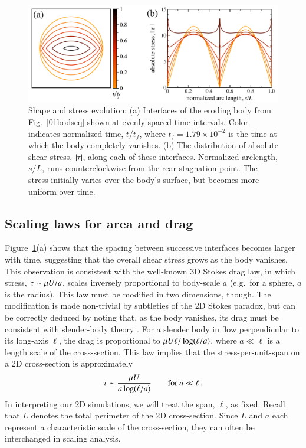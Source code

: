\documentclass[preprint, 10pt]{elsarticle}
\begin{document}
\begin{figure}%
\begin{center}
\includegraphics[width = 0.8 \textwidth]{./figs/shrink_intface.pdf}
\caption{
Shape and stress evolution: (a) Interfaces of the eroding body from Fig.~\ref{01bodseq} shown at evenly-spaced time intervals. Color indicates normalized time, $t/t_f$, where $t_f = 1.79 \times 10^{-2}$ is the time at which the body completely vanishes. (b) The distribution of absolute shear stress, $\lvert \tau \rvert$, along each of these interfaces. Normalized arclength, $s/L$, runs counterclockwise from the rear stagnation point. The stress initially varies over the body's surface, but becomes more uniform over time.}
\label{shrink_intface}
\end{center}
\end{figure}

\subsection{Scaling laws for area and drag}
\label{sec:scaling}

Figure~\ref{shrink_intface}(a) shows that the spacing between successive interfaces becomes larger with time, suggesting that the overall shear stress grows as the body vanishes. This observation is consistent with the well-known 3D Stokes drag law, in which stress, $\tau \sim \mu U / a$, scales inversely proportional to body-scale $a$ (e.g.~for a sphere, $a$ is the radius). This law must be modified in two dimensions, though. The modification is made non-trivial by subtleties of the 2D Stokes paradox, but can be correctly deduced by noting that, as the body vanishes, its drag must be consistent with slender-body theory \cite{poz1997, bouzarth2007epicyclic, camassa2008trajectory, MooreJFM2012, zhao2015transportation}. 
For a slender body in flow perpendicular to its long-axis $\ell$, the drag is proportional to
$\mu U \ell/ \log(\ell/a)$, where $a \ll \ell $ is a length scale of the cross-section. This law implies that the stress-per-unit-span on a 2D cross-section is approximately
\begin{align}
  \label{eqn:stresslaw}
  \tau \sim \frac{\mu U}{a \log(\ell/a)} \qquad \text{for } a \ll \ell \, .
\end{align}
In interpreting our 2D simulations, we will treat the span, $\ell$, as
fixed. Recall that $L$ denotes the total perimeter of the 2D cross-section. Since $L$ and $a$ each represent a characteristic scale of the cross-section, they can often be interchanged in scaling analysis.
\end{document}
